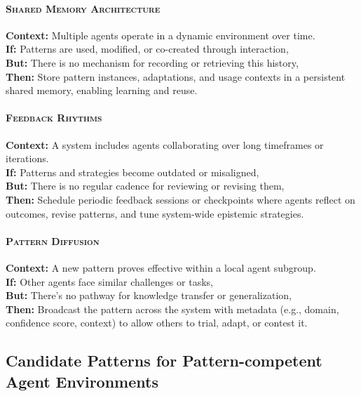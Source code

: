 \documentclass[acmlarge,timestamp]{acmart}
\begin{document}
 \paragraph*{{\scshape Shared Memory Architecture}}

\noindent \textbf{Context:} Multiple agents operate in a dynamic environment over time.\\
 \textbf{If:} Patterns are used, modified, or co-created through interaction,\\
 \textbf{But:} There is no mechanism for recording or retrieving this history,\\
 \textbf{Then:} Store pattern instances, adaptations, and usage contexts in a persistent shared memory, enabling learning and reuse.

 \paragraph*{{\scshape Feedback Rhythms}}

\noindent \textbf{Context:} A system includes agents collaborating over long timeframes or iterations.\\
 \textbf{If:} Patterns and strategies become outdated or misaligned,\\
 \textbf{But:} There is no regular cadence for reviewing or revising them,\\
 \textbf{Then:} Schedule periodic feedback sessions or checkpoints where agents reflect on outcomes, revise patterns, and tune system-wide epistemic strategies.

\paragraph*{{\scshape Pattern Diffusion}}

\noindent \textbf{Context:} A new pattern proves effective within a local agent subgroup.\\
 \textbf{If:} Other agents face similar challenges or tasks,\\
 \textbf{But:} There’s no pathway for knowledge transfer or generalization,\\
 \textbf{Then:} Broadcast the pattern across the system with metadata (e.g., domain, confidence score, context) to allow others to trial, adapt, or contest it.

\subsection*{Candidate Patterns for Pattern-competent Agent Environments}
\end{document}
